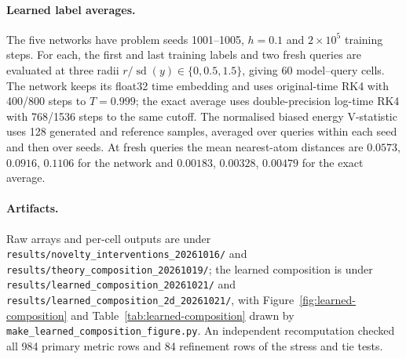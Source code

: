 \documentclass{article} %
\makeatletter
\newif\ificlr
\newcommand{\placeblock}[1]{\ificlr\@nameuse{moved@#1}\fi}
\newcommand{\iclrallow}{\allowbreak}
\theoremstyle{plain}
\theoremstyle{definition}
\theoremstyle{remark}
\makeatother
\begin{document}
\FloatBarrier
\placeblock{learnedpilot}

\paragraph{Learned label averages.} The five networks have problem seeds 1001--1005, $h=0.1$ and
$2\times10^5$ training steps. For each, the first and last training labels and two fresh queries
are evaluated at three radii $r/\operatorname{sd}(y)\in\{0,0.5,1.5\}$, giving 60 model--query cells.
The network keeps its float32 time embedding and uses original-time RK4 with 400/800 steps to
$T=0.999$; the exact average uses double-precision log-time RK4 with 768/1536 steps to the same
cutoff. The normalised biased energy V-statistic uses 128 generated and reference samples,
averaged over queries within each seed and then over seeds. At fresh queries the mean
nearest-atom distances are $0.0573$, $0.0916$, $0.1106$ for the network and $0.00183$,
$0.00328$, $0.00479$ for the exact average.

\begingroup\ificlr\raggedright\fi
\paragraph{Artifacts.} Raw arrays and per-cell outputs are under
\texttt{results/\iclrallow novelty\_interventions\_20261016/} and
\texttt{results/\iclrallow theory\_composition\_20261019/}; the learned composition is under
\texttt{results/\iclrallow learned\_composition\_20261021/} and
\texttt{results/\iclrallow learned\_composition\_2d\_20261021/}, with
Figure~\ref{fig:learned-composition} and Table~\ref{tab:learned-composition} drawn by
\texttt{make\_learned\_composition\_figure.py}. An independent recomputation checked all 984
primary metric rows and 84 refinement rows of the stress and tie tests.\par\endgroup
\end{document}

